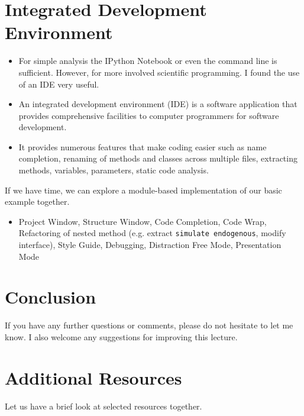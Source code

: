 \section{Integrated Development Environment}
\begin{itemize}
\item For simple analysis the IPython Notebook or even the command line is sufficient. However, for more involved scientific programming. I found the use of an IDE very useful.
\item An integrated development environment (IDE) is a software application that provides comprehensive facilities to computer programmers for software development.
\item It provides numerous features that make coding easier such as name completion, renaming of methods and classes across multiple files, extracting methods, variables, parameters, static code analysis.
\end{itemize}

If we have time, we can explore a  module-based implementation of our basic example together.
\begin{itemize}
\item Project Window, Structure Window, Code Completion, Code Wrap, Refactoring of nested method (e.g. extract \verb+simulate endogenous+, modify interface), Style Guide, Debugging, Distraction Free Mode, Presentation Mode
\end{itemize}

\section{Conclusion}
If you have any further questions or comments, please do not hesitate to let me know. I also welcome any suggestions for improving this lecture.

\section{Additional Resources}
Let us have a brief look at selected resources together.





